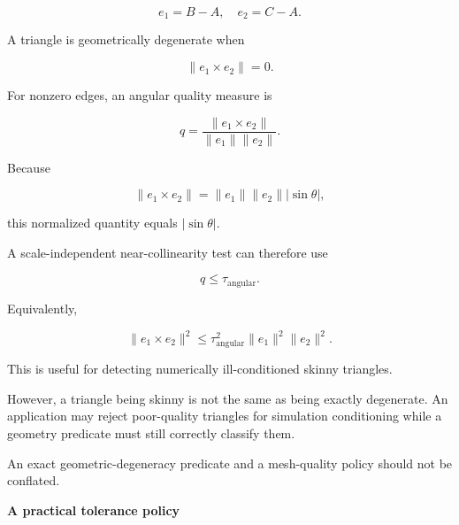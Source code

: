 \[
e_1=B-A,\quad e_2=C-A.
\]

A triangle is geometrically degenerate when

\[
\|e_1\times e_2\|=0.
\]

For nonzero edges, an angular quality measure is

\[
q=\frac{\|e_1\times e_2\|} {\|e_1\|\|e_2\|}.
\]

Because

\[
\|e_1\times e_2\| =\|e_1\|\|e_2\||\sin\theta|,
\]

this normalized quantity equals \(|\sin\theta|\).

A scale-independent near-collinearity test can therefore use

\[
q\le\tau_{\text{angular}}.
\]

Equivalently,

\[
\|e_1\times e_2\|^2 \le \tau_{\text{angular}}^2 \|e_1\|^2\|e_2\|^2.
\]

This is useful for detecting numerically ill-conditioned skinny triangles.

However, a triangle being skinny is not the same as being exactly degenerate. An application may reject poor-quality triangles for simulation conditioning while a geometry predicate must still correctly classify them.

An exact geometric-degeneracy predicate and a mesh-quality policy should not be conflated.

\textbf{A practical tolerance policy}

